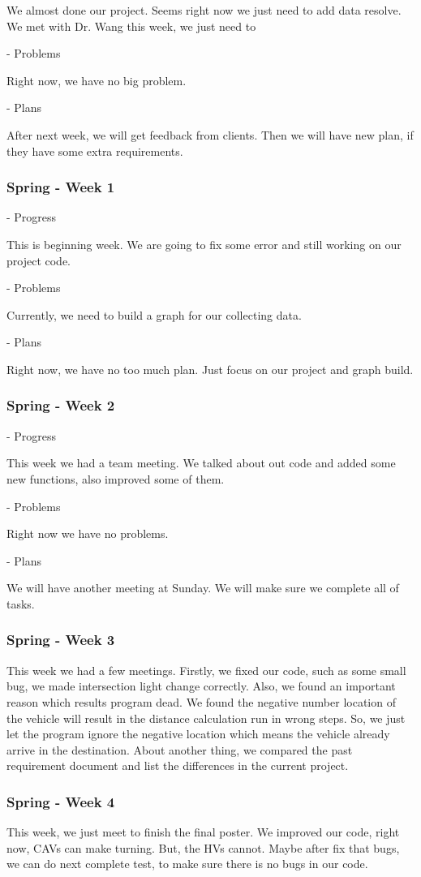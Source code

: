 \documentclass[onecolumn, draftclsnofoot,10pt, compsoc]{IEEEtran}
\begin{document}
We almost done our project.
Seems right now we just need to add data resolve.
We met with Dr. Wang this week, we just need to

- Problems

Right now, we have no big problem.

- Plans

After next week, we will get feedback from clients.
Then we will have new plan, if they have some extra requirements.
\subsubsection{Spring - Week 1}
- Progress

This is beginning week.
We are going to fix some error and still working on our project code.

- Problems

Currently, we need to build a graph for our collecting data.

- Plans

Right now, we have no too much plan.
Just focus on our project and graph build.
\subsubsection{Spring - Week 2}
- Progress

This week we had a team meeting.
We talked about out code and added some new functions, also improved some of them.

- Problems

Right now we have no problems.

- Plans

We will have another meeting at Sunday.
We will make sure we complete all of tasks.
\subsubsection{Spring - Week 3}
This week we had a few meetings.
Firstly, we fixed our code, such as some small bug, we made intersection light change correctly.
Also, we found an important reason which results program dead.
We found the negative number location of the vehicle will result in the distance calculation run in wrong steps.
So, we just let the program ignore the negative location which means the vehicle already arrive in the destination.
About another thing, we compared the past requirement document and list the differences in the current project.
\subsubsection{Spring - Week 4}
This week, we just meet to finish the final poster.
We improved our code, right now, CAVs can make turning.
But, the HVs cannot.
Maybe after fix that bugs, we can do next complete test, to make sure there is no bugs in our code.
\end{document}
